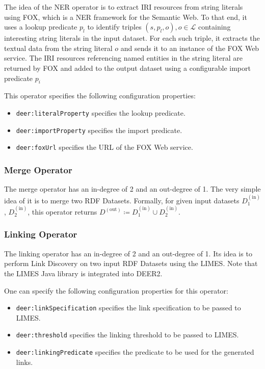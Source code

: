 The idea of the \ac{NER} operator is to extract \ac{IRI} resources from string literals using \ac{FOX}\cite{speck:2014a}, which is a \ac{NER} framework for the Semantic Web.
To that end, it uses a lookup predicate $p_l$ to identify triples $(s,p_l,o), o\in \mathcal{L}$ containing interesting string literals in the input dataset.
For each such triple, it extracts the textual data from the string literal $o$ and sends it to an instance of the \ac{FOX} Web service.
The \ac{IRI} resources referencing named entities in the string literal are returned by \ac{FOX} and added to the output dataset using a configurable import predicate $p_i$

This operator specifies the following configuration properties:

\begin{itemize}
  \item \texttt{deer:literalProperty} specifies the lookup predicate.
  \item \texttt{deer:importProperty} specifies the import predicate.
  \item \texttt{deer:foxUrl} specifies the \ac{URL} of the \ac{FOX} Web service.
\end{itemize}

\subsubsection*{Merge Operator}

The merge operator has an in-degree of 2 and an out-degree of 1.
The very simple idea of it is to merge two \ac{RDF} Datasets.
Formally, for given input datasets $D_1^{(\text{in})}$, $D_2^{(\text{in})}$, this operator returns $D^{(\text{out})}\coloneq D_1^{(\text{in})}\cup D_2^{(\text{in})}$.

\subsubsection*{Linking Operator}

The linking operator has an in-degree of 2 and an out-degree of 1.
Its idea is to perform Link Discovery on two input \ac{RDF} Datasets using the \ac{LIMES}\cite{ngomo:2011a}.
Note that the \ac{LIMES} Java library is integrated into \ac{DEER2}.

One can specify the following configuration properties for this operator:

\begin{itemize}
  \item \texttt{deer:linkSpecification} specifies the link specification to be passed to \ac{LIMES}.
  \item \texttt{deer:threshold} specifies the linking threshold to be passed to \ac{LIMES}.
  \item \texttt{deer:linkingPredicate} specifies the predicate to be used for the generated links.
\end{itemize}

